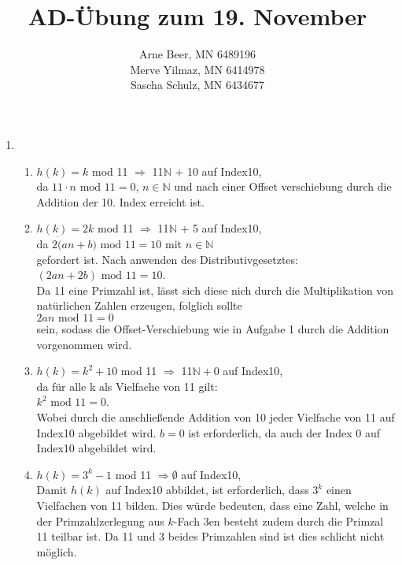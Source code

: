 \documentclass{article}
\title{AD-Übung zum 19. November}
\author{Arne Beer, MN 6489196\\
Merve Yilmaz, MN 6414978\\
Sascha Schulz, MN 6434677}
\begin{document}
\maketitle

\begin{enumerate}[\bfseries1.]
    \item
        \begin{enumerate}
            \item
                $h(k) = k$ mod 11 $\Rightarrow$  11$\mathbb{N}$ + 10 auf
                Index10, 
                \\da $11 \cdot n \text{ mod } 11 = 0$, $n \in \mathbb{N}$ und nach
                einer Offset verschiebung durch die Addition der 10. Index erreicht ist.
            \item
                $h(k) = 2k$ mod 11  $\Rightarrow$ 11$\mathbb{N}$ + 5 auf
                Index10, 
                \\da $2 \dot (an+b) \text{ mod } 11 = 10$ mit $n \in
                \mathbb{N}$ 
                \\gefordert ist. Nach anwenden des
                Distributivgesetztes: 
                \\$(2an + 2b) \text{ mod } 11 = 10$. 
                \\Da 11
                eine Primzahl ist, lässt sich diese nich durch die
                Multiplikation von natürlichen Zahlen erzeugen, folglich sollte
                \\$2an \text{ mod } 11 = 0$ 
                \\sein, sodass die Offset-Verschiebung
                wie in Aufgabe 1 durch die Addition vorgenommen wird. 
            \item
                $h(k) = k^2 + 10$ mod 11 $\Rightarrow$ 11$\mathbb{N}+0$ auf
                Index10,
                \\da für alle k als Vielfache von 11 gilt: 
                \\$k^2 \text{ mod }11 = 0$.
                \\ Wobei durch die anschließende Addition von 10 jeder Vielfache
                von 11 auf Index10 abgebildet wird. $b=0$ ist erforderlich, da
                auch der Index 0 auf Index10 abgebildet wird.
            \item
                $h(k) = 3^k -1$ mod 11 $\Rightarrow \emptyset$ auf Index10,
                \\ Damit $h(k)$ auf Index10 abbildet, ist
                erforderlich, dass $3^k$ einen Vielfachen von 11 bilden.
                Dies würde bedeuten, dass eine Zahl, welche in der
                Primzahlzerlegung aus $k$-Fach 3en besteht zudem durch die
                Primzal 11 teilbar ist. Da 11 und 3 beides Primzahlen sind ist
                dies schlicht nicht möglich.
        \end{enumerate}


\end{enumerate}
\end{document}
